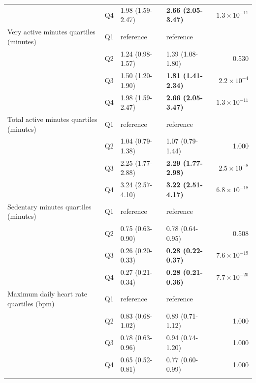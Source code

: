 \documentclass[11pt]{article}
\begin{document}
\begin{longtable}{@{}p{5.2cm}c p{3.0cm} p{3.0cm} r@{}}
 & Q4 & 1.98 (1.59-2.47) & \textbf{2.66 (2.05-3.47)} & $1.3\times10^{-11}$ \\
\addlinespace
Very active minutes quartiles (minutes) & Q1 & reference & reference & \\
 & Q2 & 1.24 (0.98-1.57) & 1.39 (1.08-1.80) & 0.530 \\
 & Q3 & 1.50 (1.20-1.90) & \textbf{1.81 (1.41-2.34)} & $2.2\times10^{-4}$ \\
 & Q4 & 1.98 (1.59-2.47) & \textbf{2.66 (2.05-3.47)} & $1.3\times10^{-11}$ \\
\addlinespace
Total active minutes quartiles (minutes) & Q1 & reference & reference & \\
 & Q2 & 1.04 (0.79-1.38) & 1.07 (0.79-1.44) & 1.000 \\
 & Q3 & 2.25 (1.77-2.88) & \textbf{2.29 (1.77-2.98)} & $2.5\times10^{-8}$ \\
 & Q4 & 3.24 (2.57-4.10) & \textbf{3.22 (2.51-4.17)} & $6.8\times10^{-18}$ \\
\addlinespace
Sedentary minutes quartiles (minutes) & Q1 & reference & reference & \\
 & Q2 & 0.75 (0.63-0.90) & 0.78 (0.64-0.95) & 0.508 \\
 & Q3 & 0.26 (0.20-0.33) & \textbf{0.28 (0.22-0.37)} & $7.6\times10^{-19}$ \\
 & Q4 & 0.27 (0.21-0.34) & \textbf{0.28 (0.21-0.36)} & $7.7\times10^{-20}$ \\
\addlinespace
Maximum daily heart rate quartiles (bpm) & Q1 & reference & reference & \\
 & Q2 & 0.83 (0.68-1.02) & 0.89 (0.71-1.12) & 1.000 \\
 & Q3 & 0.78 (0.63-0.96) & 0.94 (0.74-1.20) & 1.000 \\
 & Q4 & 0.65 (0.52-0.81) & 0.77 (0.60-0.99) & 1.000 \\
\addlinespace
\bottomrule \end{longtable}
\end{document}
